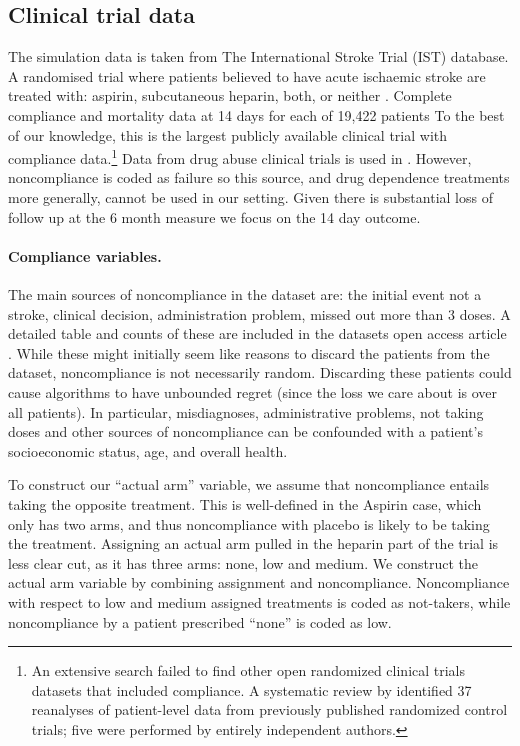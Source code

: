 \subsection{Clinical trial data}
\label{sec:data}

The simulation data is taken from The International Stroke Trial (IST) database. A randomised trial where patients believed to have acute ischaemic stroke are treated with: aspirin, subcutaneous heparin, both, or neither \cite{ist:97}.
Complete compliance and mortality data at 14 days for each of 19,422 patients
To the best of our knowledge, this is the largest publicly available clinical trial with compliance data.\footnote{An extensive search failed to find other open randomized clinical trials datasets that included compliance. A systematic review by  \cite{ebrahim:14} identified 37 reanalyses of patient-level data from previously published randomized control trials; five were performed by entirely independent authors.} Data from drug abuse clinical trials is used in \cite{kuleshov:14}. However, noncompliance is coded as failure so this source, and drug dependence treatments more generally, cannot be used in our setting. Given there is substantial loss of follow up at the 6 month measure we focus on the 14 day outcome. 

\paragraph{Compliance variables.}
The main sources of noncompliance in the dataset are: the initial event not a stroke, clinical decision, administration problem, missed out more than 3 doses. A detailed table and counts of these are included in the datasets open access article \cite{ist:11}. 
While these might initially seem like reasons to discard the patients from the dataset, noncompliance is not necessarily random. Discarding these patients could cause algorithms to have unbounded regret (since the loss we care about is over all patients). In particular, misdiagnoses, administrative problems, not taking doses and other sources of noncompliance can be confounded with a patient's socioeconomic status, age, and overall health. 

To construct our ``actual arm'' variable, we assume that noncompliance entails taking the opposite treatment.
This is well-defined in the Aspirin case, which only has two arms, and thus noncompliance with placebo is likely to be taking the treatment.
Assigning an actual arm pulled in the heparin part of the trial is less clear cut, as it has three arms: none, low and medium. We construct the actual arm variable by combining assignment and noncompliance. Noncompliance with respect to low and medium assigned treatments is coded as  not-takers, while noncompliance by a patient prescribed ``none'' is coded as low.


